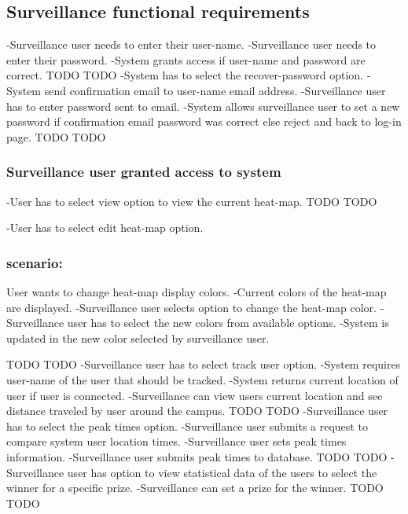 \subsection{Surveillance functional requirements}
 		{-Surveillance user needs to enter their user-name.
 		-Surveillance user needs to enter their password.
 		-System grants access if user-name and password are correct.}
 		 {TODO}
		 {TODO}
 		{-System has to select the recover-password option.
 		-System send confirmation email to user-name email address.
		-Surveillance user has to enter password sent to email.
	  	-System allows surveillance user to set a new password if confirmation email password was correct 			 else reject and back to log-in page.}
	  	 {TODO}
		 {TODO}
\subsubsection{Surveillance user granted access to system}
		{-User has to select view option to view the current heat-map.}
		 {TODO}
		 {TODO}
		{-User has to select edit heat-map option.
		\subsubsection{scenario:}
		 {User wants to change heat-map display colors.}
		{-Current colors of the heat-map are displayed.
		-Surveillance user selects option to change the heat-map color.
		-Surveillance user has to select the new colors from available options.
		-System is updated in the new color selected by surveillance user.}	
		}
		 {TODO}
		 {TODO}	
		{-Surveillance user has to select track user option.
		-System requires user-name of the user that should be tracked.
		-System returns current location of user if user is connected.
		-Surveillance can view users current location and see distance traveled by user around the campus.}
		 {TODO}
		 {TODO}
		{-Surveillance user has to select the peak times option.
		-Surveillance user submits a request to compare system user location times.
		-Surveillance user sets peak times information.
		-Surveillance user submits peak times to database.}
		 {TODO}
		 {TODO}
		{-Surveillance user has option to view statistical data of the users to select the winner for a specific prize.
		 -Surveillance can set a prize for the winner.}
		 {TODO}
		 {TODO}
